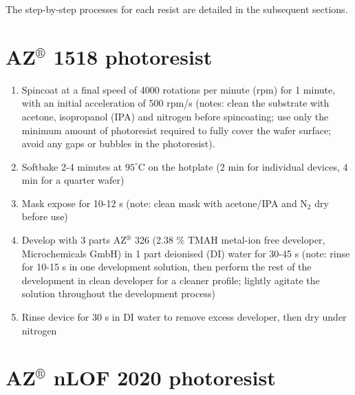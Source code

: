 \documentclass[
  a4paper,
]{scrbook}
\begin{document}
The step-by-step processes for each resist are detailed in the
subsequent sections.

\hypertarget{azcircledr-1518-photoresist}{%
\section{\texorpdfstring{AZ\(^\circledR\) 1518
photoresist}{AZ\^{}\textbackslash circledR 1518 photoresist}}\label{azcircledr-1518-photoresist}}

\begin{enumerate}
\def\labelenumi{\arabic{enumi}.}
\item
  Spincoat at a final speed of 4000 rotations per minute (rpm) for 1
  minute, with an initial acceleration of 500 rpm/s (notes: clean the
  substrate with acetone, isopropanol (IPA) and nitrogen before
  spincoating; use only the minimum amount of photoresist required to
  fully cover the wafer surface; avoid any gaps or bubbles in the
  photoresist).
\item
  Softbake 2-4 minutes at \(95^\circ\)C on the hotplate (2 min for
  individual devices, 4 min for a quarter wafer)
\item
  Mask expose for 10-12 s (note: clean mask with acetone/IPA and N\(_2\)
  dry before use)
\item
  Develop with 3 parts AZ\(^\circledR\) 326 (2.38 \% TMAH metal-ion free
  developer, Microchemicals GmbH) in 1 part deionised (DI) water for
  30-45 s (note: rinse for 10-15 s in one development solution, then
  perform the rest of the development in clean developer for a cleaner
  profile; lightly agitate the solution throughout the development
  process)
\item
  Rinse device for 30 s in DI water to remove excess developer, then dry
  under nitrogen
\end{enumerate}

\hypertarget{azcircledr-nlof-2020-photoresist}{%
\section{\texorpdfstring{AZ\(^\circledR\) nLOF 2020
photoresist}{AZ\^{}\textbackslash circledR nLOF 2020 photoresist}}\label{azcircledr-nlof-2020-photoresist}}
\end{document}
